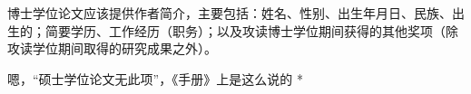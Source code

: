 \biography
博士学位论文应该提供作者简介，主要包括：姓名、性别、出生年月日、民族、出生的；简要学历、工作经历（职务）；以及攻读博士学位期间获得的其他奖项（除攻读学位期间取得的研究成果之外）。

\par * 嗯，“硕士学位论文无此项”，《手册》上是这么说的 * \par